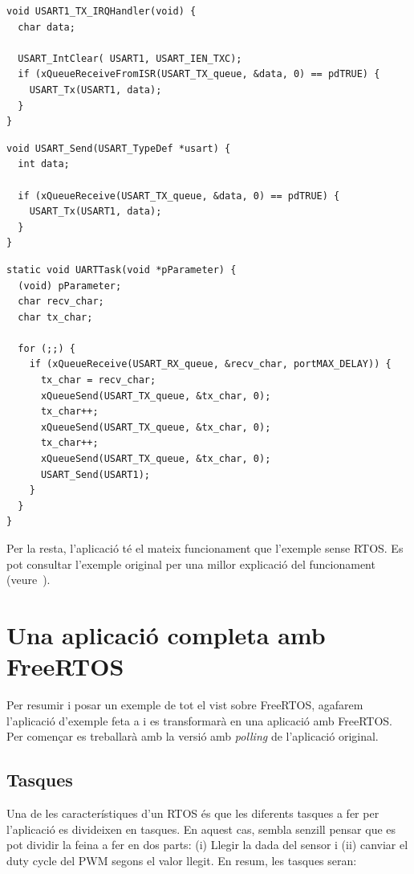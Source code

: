 \begin{lstlisting}[style=customc,caption={ISR de TX de la UART amb FreeRTOS}]
void USART1_TX_IRQHandler(void) {
  char data;

  USART_IntClear( USART1, USART_IEN_TXC);
  if (xQueueReceiveFromISR(USART_TX_queue, &data, 0) == pdTRUE) {
    USART_Tx(USART1, data);
  }
}
\end{lstlisting}

\begin{lstlisting}[style=customc,caption={funció UART\_Send() per FreeRTOS}]
void USART_Send(USART_TypeDef *usart) {
  int data;

  if (xQueueReceive(USART_TX_queue, &data, 0) == pdTRUE) {
    USART_Tx(USART1, data);
  }
}
\end{lstlisting}

\begin{lstlisting}[style=customc,caption=Tasca principal de l'exemple]
static void UARTTask(void *pParameter) {
  (void) pParameter;
  char recv_char;
  char tx_char;

  for (;;) {
    if (xQueueReceive(USART_RX_queue, &recv_char, portMAX_DELAY)) {
      tx_char = recv_char;
      xQueueSend(USART_TX_queue, &tx_char, 0);
      tx_char++;
      xQueueSend(USART_TX_queue, &tx_char, 0);
      tx_char++;
      xQueueSend(USART_TX_queue, &tx_char, 0);
      USART_Send(USART1);
    }
  }
}
\end{lstlisting}


Per la resta, l'aplicació té el mateix funcionament que l'exemple sense RTOS. Es pot consultar l'exemple original per una millor explicació del funcionament (veure~).


\chapter{Una aplicació completa amb FreeRTOS}

Per resumir i posar un exemple de tot el vist sobre \gls{FreeRTOS}, agafarem l'aplicació d'exemple feta a  i es transformarà en una aplicació amb FreeRTOS. Per començar es treballarà amb la versió amb {\em polling} de l'aplicació original.

\section{Tasques}
Una de les característiques d'un \gls{RTOS} és que les diferents tasques a fer per l'aplicació es divideixen en tasques. En aquest cas, sembla senzill pensar que es pot dividir la feina a fer en dos parts: (i) Llegir la dada del sensor i (ii) canviar el \gls{duty cycle} del \gls{PWM} segons el valor llegit. En resum, les tasques seran:

